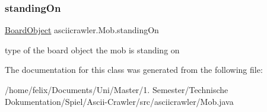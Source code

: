 \subsubsection{\texorpdfstring{standing\+On}{standingOn}}
{\footnotesize\ttfamily \hyperlink{classasciicrawler_1_1BoardObject}{Board\+Object} asciicrawler.\+Mob.\+standing\+On}

type of the board object the mob is standing on 

The documentation for this class was generated from the following file\+:\begin{DoxyCompactItemize}
\item 
/home/felix/\+Documents/\+Uni/\+Master/1. Semester/\+Technische Dokumentation/\+Spiel/\+Ascii-\/\+Crawler/src/asciicrawler/Mob.\+java\end{DoxyCompactItemize}
